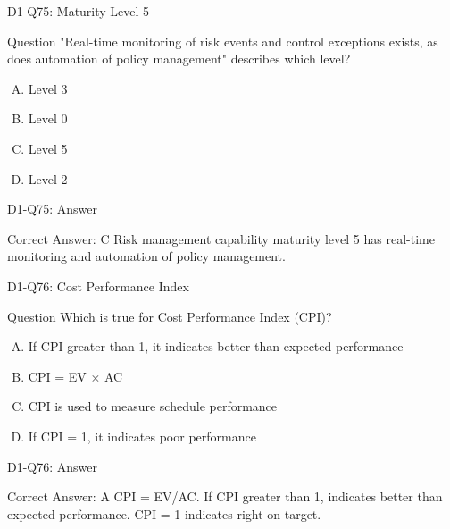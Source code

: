 \documentclass{beamer}
\begin{document}
	\begin{frame}{D1-Q75: Maturity Level 5}
		\begin{block}{Question}
			"Real-time monitoring of risk events and control exceptions exists, as does automation of policy management" describes which level?
		\end{block}
		\begin{enumerate}[(A)]
			\item Level 3
			\item Level 0
			\item Level 5
			\item Level 2
		\end{enumerate}
	\end{frame}
	\begin{frame}{D1-Q75: Answer}
		\begin{block}{Correct Answer: C}
			Risk management capability maturity level 5 has real-time monitoring and automation of policy management.
		\end{block}
	\end{frame}
	
	\begin{frame}{D1-Q76: Cost Performance Index}
		\begin{block}{Question}
			Which is true for Cost Performance Index (CPI)?
		\end{block}
		\begin{enumerate}[(A)]
			\item If CPI greater than 1, it indicates better than expected performance
			\item CPI = EV × AC
			\item CPI is used to measure schedule performance
			\item If CPI = 1, it indicates poor performance
		\end{enumerate}
	\end{frame}
	\begin{frame}{D1-Q76: Answer}
		\begin{block}{Correct Answer: A}
			CPI = EV/AC. If CPI greater than 1, indicates better than expected performance. CPI = 1 indicates right on target.
		\end{block}
	\end{frame}
	
\end{document}
